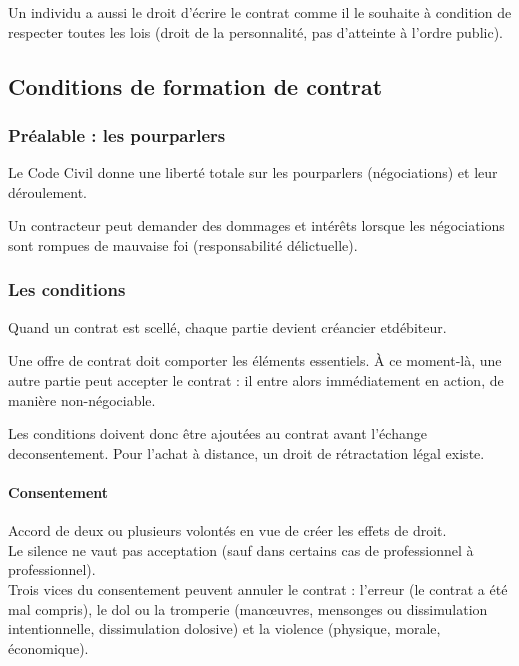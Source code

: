 \documentclass[10pt,a4paper,french]{article}
\begin{document}
Un individu a aussi le droit d'écrire le contrat comme il le souhaite à condition de respecter toutes les lois (droit de la personnalité, pas d'atteinte à l'ordre public).

\subsection{Conditions de formation de contrat}

\subsubsection{Préalable : les pourparlers}
Le Code Civil donne une liberté totale sur les pourparlers (négociations) et leur déroulement.

Un contracteur peut demander des dommages et intérêts lorsque les négociations sont rompues de mauvaise foi (responsabilité délictuelle).

\subsubsection{Les conditions}

Quand un contrat est scellé, chaque partie devient créancier etdébiteur.

Une offre de contrat doit comporter les éléments essentiels. À ce moment-là, une autre partie peut accepter le contrat : il entre alors immédiatement en action, de manière non-négociable.

Les conditions doivent donc être ajoutées au contrat avant l'échange deconsentement. Pour l'achat à distance, un droit de rétractation légal existe.

\paragraph{Consentement}
Accord de deux ou plusieurs volontés en vue de créer les effets de droit. \\
Le silence ne vaut pas acceptation (sauf dans certains cas de professionnel à professionnel). \\
Trois vices du consentement peuvent annuler le contrat : l'erreur (le contrat a été mal compris), le dol ou la tromperie (manœuvres, mensonges ou dissimulation intentionnelle, dissimulation dolosive) et la violence (physique, morale, économique).
\end{document}
